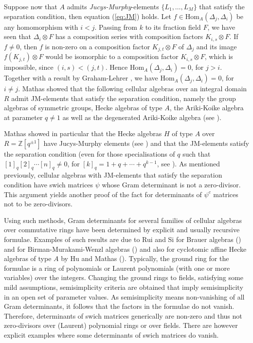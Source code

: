 \documentclass[oneside, a4paper, 11pt]{amsart}
\newcommand{\Z}{\mathbb{Z}}
\newcommand{\Hom}{\mathrm{Hom}}
\begin{document}
Suppose now that $A$ admits \emph{Jucys-Murphy}-elements $\{L_1, \ldots, L_M\}$ that satisfy the separation condition, then equation (\ref{eq:JM}) holds. Let $f\in \Hom_A(\Delta_j,\Delta_i)$ be any homomorphism with $i<j$. Passing from $k$ to its fraction field $F$, we have seen that $\Delta_i \otimes F$ has a composition series with composition factors $K_{i,s} \otimes F$. If $f\neq 0$, then $f$ is non-zero on a composition factor $K_{j,t} \otimes F$ of $\Delta_j$ and its image $f(K_{j,t}) \otimes F$ would be isomorphic to a composition factor $K_{i,s} \otimes F$, which is impossible, since $(i,s)<(j,t)$. Hence $\Hom_A(\Delta_j,\Delta_i)=0$, for $j>i$. Together with a result by Graham-Lehrer 
\cite[Proposition 2.6]{GrahamLehrer},
we have $\Hom_A(\Delta_j,\Delta_i)=0$, for $i\neq j$.
Mathas showed that the following cellular algebras over an integral domain $R$ admit JM-elements that satisfy the separation condition, namely the group algebras of symmetric groups, Hecke algebras of type $A$, the Ariki-Koike algebra at parameter  $q\neq 1$ as well as the degenerated Ariki-Koike algebra (see \cite[Theorem 4.10]{Mathas}).


Mathas showed in particular that the Hecke algebras
$H$ of type $A$ over $R=\Z[q^{\pm 1}]$
have Jucys-Murphy elements (see \cite[Example 2.15]{Mathas}) and that the
JM-elements satisfy the separation condition (even for those specialisations
of $q$ such that  $[1]_q[2]_q\cdots [n]_q \neq 0$, for
$[k]_q = 1+q+\cdots + q^{k-1}$, see \cite[Theorem 3.32]{Mathas99}). As
mentioned previously, cellular algebras with JM-elements that
satisfy the separation condition have swich matrices $\psi$ whose Gram
determinant is not a zero-divisor. This argument yields another proof
of the fact for determinants of $\psi^c$ matrices not to be zero-divisors.
\medskip

Using such methods, Gram determinants for several
families of cellular algebras over commutative rings have been determined
by explicit and usually recursive formulae. Examples of such results are
due to Rui and Si for Brauer algebras (\cite[Theorem 4.11]{RuiSibrauer})
and for Birman-Murakami-Wenzl algebras (\cite[Theorem 4.13]{RuiSibmw}) and
also for cyclotomic affine Hecke algebras of type $A$ by Hu and Mathas
(\cite[Theorem 3.13]{HuMathas}). Typically, the ground ring for the formulae
is a ring of polynomials or Laurent polynomials (with one or more variables)
over the integers. Changing the ground rings to fields, satisfying some mild
assumptions, semisimplicity criteria are obtained that imply semisimplicity
in an open set of parameter values. As semisimplicity means non-vanishing
of all Gram determinants, it follows that the factors in the formulae do
not vanish. Therefore, determinants of swich matrices generically are
non-zero and thus not zero-divisors over (Laurent) polynomial rings or
over fields. There are however explicit examples where some determinants
of swich matrices do vanish.
\end{document}
